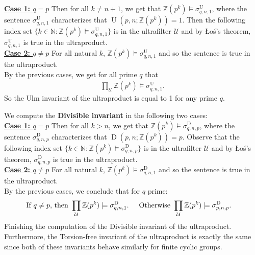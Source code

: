 \documentclass[10pt,a4paper]{amsart}
\theoremstyle{definition}
\newcommand{\Los}{\L o\'s}
\newcommand{\U}{\mathcal{U}}
\begin{document}
\underline{\textbf{Case 1: $q=p$}} Then for all $k\neq n+1$, we get that $\mathbb{Z}(p^{k})\models \sigma_{q,n,1}^{\operatorname{U}}$, where the sentence $\sigma_{q,n,1}^{\operatorname{U}}$ characterizes that $\operatorname{U}(p,n; \mathbb{Z}(p^{k}))=1$. Then the following index set $\{k\in\mathbb{N}:\mathbb{Z}(p^{k})\models \sigma_{q,n,1}^{\operatorname{U}}\}$ is in the ultrafilter $\U$ and by \Los's theorem, $\sigma_{q,n,1}^{\operatorname{U}}$ is true in the ultraproduct.\\

\underline{\textbf{Case 2: $q\neq p$}} For all natural $k$, $\mathbb{Z}(p^{k})\models \sigma_{q,n,1}^{\operatorname{U}}$ and so the sentence is true in the ultraproduct.\\

\noindent By the previous cases, we get for all prime $q$ that
\begin{align*}
    \prod\limits_{\mathcal{U}} \mathbb{Z}(p^{k})\models \sigma_{q,n,1}^{\operatorname{U}}. 
\end{align*}
So the Ulm invariant of the ultraproduct is equal to 1 for any prime $q$.

\item We compute the \textbf{Divisible invariant} in the following two cases:\\

\underline{\textbf{Case 1: $q=p$}} Then for all $k> n$, we get that $\mathbb{Z}(p^{k})\models \sigma_{q,n,p}^{\operatorname{D}}$, where the sentence $\sigma_{q,n,p}^{\operatorname{D}}$ characterizes that $\operatorname{D}(p,n; \mathbb{Z}(p^{k}))=p$. Observe that the following index set $\{k\in\mathbb{N}:\mathbb{Z}(p^{k})\models \sigma_{q,n,p}^{\operatorname{D}}\}$ is in the ultrafilter $\U$ and by \Los's theorem, $\sigma_{q,n,p}^{\operatorname{D}}$ is true in the ultraproduct.\\

\underline{\textbf{Case 2: $q\neq p$}} For all natural $k$, $\mathbb{Z}(p^{k})\models \sigma_{q,n,1}^{\operatorname{D}}$ and so the sentence is true in the ultraproduct.\\

\noindent By the previous cases, we conclude that for $q$ prime:
\begin{align*}
    &\text{If $q\neq p$, then }\prod\limits_{\mathcal{U}} \mathbb{Z}(p^{k})\models \sigma_{q,n,1}^{\operatorname{D}}.\hspace{0.5cm}\text{Otherwise }\prod\limits_{\mathcal{U}} \mathbb{Z}(p^{k})\models \sigma_{p,n,p}^{\operatorname{D}}. 
\end{align*}
Finishing the computation of the Divisible invariant of the ultraproduct. Furthermore, the Torsion-free invariant of the ultraproduct is exactly the same since both of these invariants behave similarly for finite cyclic groups.
\end{document}
